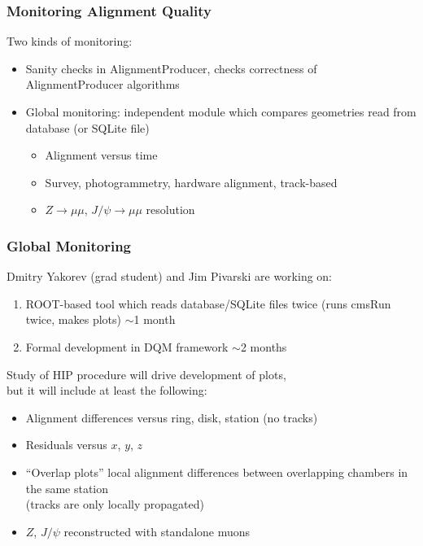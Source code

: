 \documentclass[compress]{beamer}
\begin{document}
\begin{frame}
\frametitle{Monitoring Alignment Quality}

Two kinds of monitoring:

\vspace{0.2 cm}
\begin{itemize}\setlength{\itemsep}{0.4 cm}
\item Sanity checks in AlignmentProducer, checks correctness of AlignmentProducer algorithms
\item Global monitoring: independent module which compares geometries read from database (or SQLite file)

\vspace{0.2 cm}
\begin{itemize}\setlength{\itemsep}{0.3 cm}
  \item Alignment versus time
  \item Survey, photogrammetry, hardware alignment, track-based
  \item $Z\to\mu\mu$, $J/\psi\to\mu\mu$ resolution
\end{itemize}
\end{itemize}
\end{frame}

\begin{frame}
\frametitle{Global Monitoring}

Dmitry Yakorev (grad student) and Jim Pivarski are working on:
\begin{enumerate}
\item ROOT-based tool which reads database/SQLite files twice (runs cmsRun twice, makes plots) \hfill $\sim$1 month\textcolor{white}{s}
\item Formal development in DQM framework \hfill $\sim$2 months
\end{enumerate}

\vfill Study of HIP procedure will drive development of plots, \\ but it will include at least the following:
\begin{itemize}
\item Alignment differences versus ring, disk, station (no tracks)
\item Residuals versus $x$, $y$, $z$
\item ``Overlap plots'' local alignment differences between
overlapping chambers in the same station \\ (tracks are only locally
propagated)
\item $Z$, $J/\psi$ reconstructed with standalone muons
\end{itemize}
\end{frame}
\end{document}
